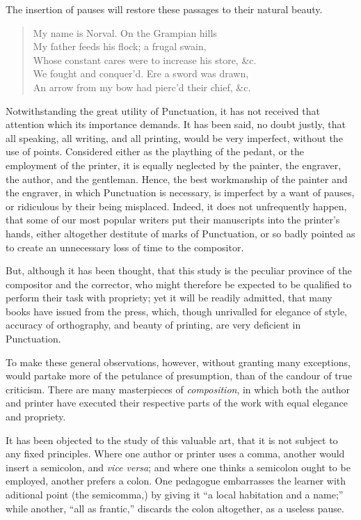 The insertion of pauses will restore these passages to their natural beauty.

\begin{quote}
    \small
    My name is Norval. On the Grampian hills\\
    My father feeds his flock; a frugal swain,\\
    Whose constant cares were to increase his store, \&c.\\
    We fought and conquer'd. Ere a sword was drawn,\\
    An arrow from my bow had pierc'd their chief, \&c.
    \normalsize
\end{quote}

Notwithstanding the great utility of Punctuation, it has not received that
attention which its importance demands. It has been said, no doubt justly, that
all speaking, all writing, and all printing, would be very imperfect, without
the use of points. Considered either as the plaything of the pedant, or the
employment of the printer, it is equally neglected by the painter, the engraver,
the author, and the gentleman. Hence, the best workmanship of the painter and
the engraver, in which Punctuation is necessary, is imperfect by a want of
pauses, or ridiculous by their being misplaced. Indeed, it does not unfrequently
happen, that some of our most popular writers put their manuscripts into the
printer's hands, either altogether destitute of marks of Punctuation, or so
badly pointed as to create an unnecessary loss of time to the compositor.

But, although it has been thought, that this study is the peculiar province of
the compositor and the corrector, who might therefore be expected to be
qualified to perform their task with propriety; yet it will be readily admitted,
that many books have issued from the press, which, though unrivalled for
elegance of style, accuracy of orthography, and beauty of printing, are very
deficient in Punctuation.

To make these general observations, however, without granting many exceptions,
would partake more of the petulance of presumption, than of the candour of true
criticism. There are many masterpieces of \emph{composition}, in which both the
author and printer have executed their respective parts of the work with equal
elegance and propriety.

It has been objected to the study of this valuable art, that it is not subject
to any fixed principles. Where one author or printer uses a comma, another would
insert a semicolon, and \emph{vice versa}; and where one thinks a semicolon
ought to be employed, another prefers a colon. One pedagogue embarrasses the
learner with aditional point (the semicomma,) by giving it ``a local habitation
and a name;'' while another, ``all as frantic,'' discards the colon altogether,
as a useless pause.

